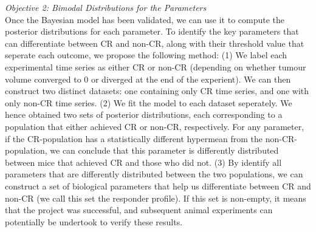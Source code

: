 \documentclass[11pt]{article}
\begin{document}

\textit{Objective 2: Bimodal Distributions for the Parameters}\\[3pt]
Once the Bayesian model has been validated, we can use it to compute the posterior distributions for each parameter. To identify the key parameters that can differentiate between CR and non-CR, along with their threshold value that seperate each outcome, we propose the following method:
(1) We label each experimental time series as either CR or non-CR (depending on whether tumour volume converged to 0 or diverged at the end of the experient). We can then construct two distinct datasets: one containing only CR time series, and one with only non-CR time series.
(2) We fit the model to each dataset seperately. We hence obtained two sets of posterior distributions, each corresponding to a population that either achieved CR or non-CR, respectively. For any parameter, if the CR-population has a statistically different hypermean from the non-CR-population, we can conclude that this parameter is differently distributed between mice that achieved CR and those who did not. 
(3) By identify all parameters that are differently distributed between the two populations, we can construct a set of biological parameters that help us differentiate between CR and non-CR (we call this set the responder profile). If this set is non-empty, it means that the project was successful, and subsequent animal experiments can potentially be undertook to verify these results.
\end{document}
